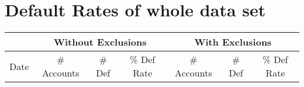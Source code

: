 \chapter{Default Rates of whole data set}
\label{sec:DR_whole}

\begin{longtable}{r|rrr|rrr}\toprule
\multicolumn{1}{l}{}     & \multicolumn{3}{c}{Without Exclusions}                                                         & \multicolumn{3}{c}{With Exclusions}                                                            \\
\endfirsthead
%
\endhead
%
\multicolumn{1}{c}{Date} & \multicolumn{1}{c}{\# Accounts} & \multicolumn{1}{c}{\# Def} & \multicolumn{1}{c}{\% Def Rate} & \multicolumn{1}{c}{\# Accounts} & \multicolumn{1}{c}{\# Def} & \multicolumn{1}{c}{\% Def Rate} \\\midrule


\end{longtable}
